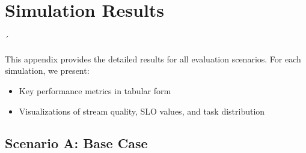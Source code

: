 \appendix
\chapter{Simulation Results}
´\label{appendix:chap:simulation-results}

This appendix provides the detailed results for all evaluation scenarios. For each simulation, we present:
\begin{itemize}
    \item Key performance metrics in tabular form
    \item Visualizations of stream quality, SLO values, and task distribution
\end{itemize}


\section{Scenario A: Base Case}





